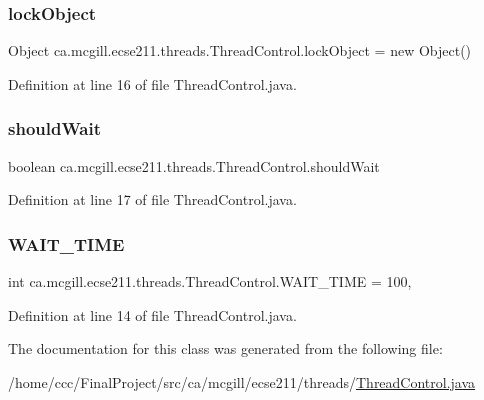 \subsubsection{\texorpdfstring{lock\+Object}{lockObject}}
{\footnotesize\ttfamily Object ca.\+mcgill.\+ecse211.\+threads.\+Thread\+Control.\+lock\+Object = new Object()\hspace{0.3cm}{\ttfamily [protected]}}



Definition at line 16 of file Thread\+Control.\+java.

\mbox{\label{classca_1_1mcgill_1_1ecse211_1_1threads_1_1_thread_control_a8252930dab1b067da64cf2afae4fc630}} 
\subsubsection{\texorpdfstring{should\+Wait}{shouldWait}}
{\footnotesize\ttfamily boolean ca.\+mcgill.\+ecse211.\+threads.\+Thread\+Control.\+should\+Wait\hspace{0.3cm}{\ttfamily [protected]}}



Definition at line 17 of file Thread\+Control.\+java.

\mbox{\label{classca_1_1mcgill_1_1ecse211_1_1threads_1_1_thread_control_a395cfe1d73b3ef14da0830ed0a499f82}} 
\subsubsection{\texorpdfstring{W\+A\+I\+T\+\_\+\+T\+I\+ME}{WAIT\_TIME}}
{\footnotesize\ttfamily int ca.\+mcgill.\+ecse211.\+threads.\+Thread\+Control.\+W\+A\+I\+T\+\_\+\+T\+I\+ME = 100\hspace{0.3cm}{\ttfamily [static]}, {\ttfamily [protected]}}



Definition at line 14 of file Thread\+Control.\+java.



The documentation for this class was generated from the following file\+:\begin{DoxyCompactItemize}
\item 
/home/ccc/\+Final\+Project/src/ca/mcgill/ecse211/threads/\hyperlink{_thread_control_8java}{Thread\+Control.\+java}\end{DoxyCompactItemize}
